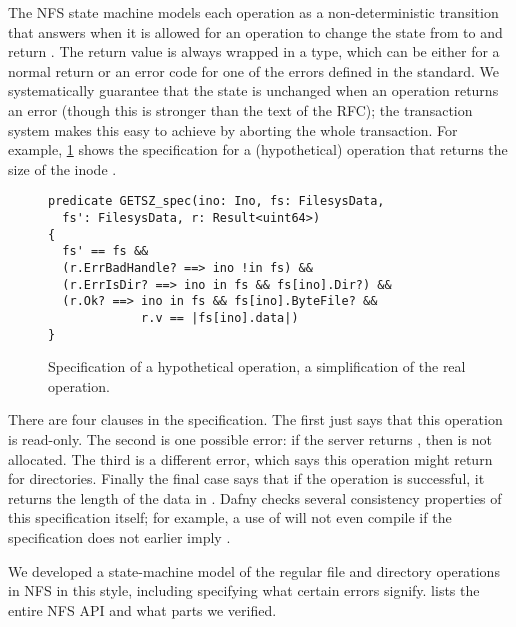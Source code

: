 The NFS state machine models each operation as a non-deterministic transition
that answers when it is allowed for an operation to change the state from
 to  and return . The return value is always wrapped in a
 type, which can be either  for a normal return or an error
code for one of the errors defined in the standard. We systematically guarantee
that the state is unchanged when an operation returns an error (though this is
stronger than the text of the RFC); the transaction system makes this easy to
achieve by aborting the whole transaction. For example,
\cref{fig:getsz} shows the
specification for a (hypothetical)  operation that returns the size of
the inode .

\begin{figure}
\small
\begin{verbatim}
predicate GETSZ_spec(ino: Ino, fs: FilesysData,
  fs': FilesysData, r: Result<uint64>)
{
  fs' == fs &&
  (r.ErrBadHandle? ==> ino !in fs) &&
  (r.ErrIsDir? ==> ino in fs && fs[ino].Dir?) &&
  (r.Ok? ==> ino in fs && fs[ino].ByteFile? &&
             r.v == |fs[ino].data|)
}
\end{verbatim}
\vspace{-\baselineskip}
\caption{Specification of a hypothetical  operation, a simplification
  of the real  operation.}
\label{fig:getsz}
\end{figure}

There are four clauses in the specification. The first just says that this
operation is read-only. The second is one possible error: if the server returns
, then  is not allocated. The third is a different
error, which says this operation might return  for directories.
Finally the final case says that if the operation is successful, it returns the
length of the data in . Dafny checks several consistency properties
of this specification itself; for example, a use of  will not even
compile if the specification does not earlier imply .

We developed a state-machine model of the regular file and directory operations
in NFS in this style, including specifying what certain errors
signify.  lists the entire NFS API and what parts we verified.

\renewcommand{\check}{\textcolor{ForestGreen}{\checkmark}}
\newcommand{\nope}{\textcolor{Maroon}{\ding{55}}}

